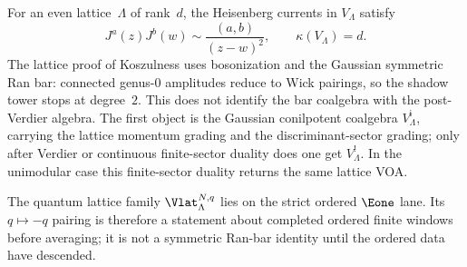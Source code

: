 \begin{remark}
\label{rem:lattice-firewall-kp}
For an even lattice~$\Lambda$ of rank~$d$, the Heisenberg currents in
$V_\Lambda$ satisfy
\[
J^a(z)J^b(w)\sim \frac{(a,b)}{(z-w)^2},
\qquad
\kappa(V_\Lambda)=d.
\]
The lattice proof of Koszulness uses bosonization and the Gaussian
symmetric Ran bar: connected genus-$0$ amplitudes reduce to Wick
pairings, so the shadow tower stops at degree~$2$. This does not identify
the bar coalgebra with the post-Verdier algebra. The first object is the
Gaussian conilpotent coalgebra $V_\Lambda^{\mathrm i}$, carrying the
lattice momentum grading and the discriminant-sector grading; only
after Verdier or continuous finite-sector duality does one get
$V_\Lambda^!$. In the unimodular case this finite-sector duality returns
the same lattice VOA.

The quantum lattice family $\Vlat_\Lambda^{N,q}$ lies on the strict
ordered $\Eone$ lane. Its $q\mapsto -q$ pairing is therefore a statement
about completed ordered finite windows before averaging; it is not a
symmetric Ran-bar identity until the ordered data have descended.
\end{remark}

